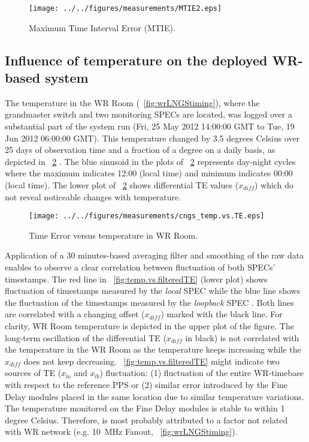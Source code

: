 \begin{figure}[!t]
\centering
\texttt{[image: ../../figures/measurements/MTIE2.eps]}
\caption{Maximum Time Interval Error (MTIE).}
\label{fig:MTIE}
\end{figure}

\subsection{Influence of temperature on the deployed WR-based system}

The temperature in the WR Room (\figurename~\ref{fig:wrLNGStiming}), where the grandmaster
switch and two monitoring SPECs are located, was logged over a substantial
part of the system run (Fri, 25 May 2012 14:00:00 GMT to Tue, 19 Jun 2012 06:00:00 GMT).
This temperature changed by 3.5 degrees Celsius over 25 days of observation time and 
a fraction of a degree on a daily basis, as depicted in \figurename~\ref{fig:temp.vs.TE} 
. 
The blue sinusoid in the plots of \figurename~\ref{fig:temp.vs.TE} represents day-night cycles where the maximum indicates 
12:00 (local time) and minimum indicates 00:00 (local time). The lower plot of \figurename~\ref{fig:temp.vs.TE}
shows differential TE values ($x_{diff}$) which do not reveal noticeable changes with temperature. 

\begin{figure}[!t]
\centering
\texttt{[image: ../../figures/measurements/cngs\_temp.vs.TE.eps]}
\caption{Time Error versus temperature in WR Room.}
\label{fig:temp.vs.TE}
\end{figure}

Application of a 30 minutes-based averaging filter and smoothing of the raw data 
 enables to observe 
a clear correlation between fluctuation of both SPECs' timestamps. The red line in 
\figurename~\ref{fig:temp.vs.filteredTE} (lower plot) shows fluctuation of timestamps measured by the 
\textit{local} SPEC  while the blue line shows the fluctuation of the timestamps measured by the 
\textit{loopback} SPEC . Both lines
are correlated with a changing offset ($x_{diff}$) marked with the black line. For clarity,
WR Room temperature is depicted in the upper plot of the figure. The 
long-term oscillation of the differential TE ($x_{diff}$ in black) is not correlated 
with the temperature in the WR Room as the temperature keeps increasing while the 
$x_{diff}$ does not keep decreasing.
\figurename~\ref{fig:temp.vs.filteredTE} might indicate two sources of TE 
($x_{lo}$ and $x_{lb}$) fluctuation: (1) fluctuation of the entire WR-timebase with respect
to the reference PPS or (2) similar error introduced by the Fine Delay modules placed in the 
same location due to similar temperature variations.
The temperature monitored on the Fine Delay modules is stable to within 1 degree Celsius. Therefore,
 is most probably attributed to a factor not 
related with WR network (e.g. 10~MHz Fanout, \figurename~\ref{fig:wrLNGStiming}).


